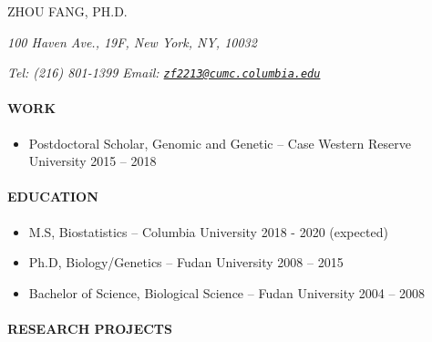 \documentclass[]{article}
\title{}
\author{}
\date{}
\let\oldparagraph\paragraph
\renewcommand{\paragraph}[1]{\oldparagraph{#1}\mbox{}}
\begin{document}
ZHOU FANG, PH.D.

\emph{100 Haven Ave., 19F, New York, NY, 10032}

\emph{Tel: (216) 801-1399 Email:
\href{mailto:zf2213@cumc.columbia.edu}{\nolinkurl{zf2213@cumc.columbia.edu}}}

\hypertarget{work}{%
\paragraph{WORK}\label{work}}

\begin{itemize}
\item
  Postdoctoral Scholar, Genomic and Genetic -- Case Western Reserve
  University { 2015 -- 2018 }
\end{itemize}

\hypertarget{education}{%
\paragraph{EDUCATION}\label{education}}

\begin{itemize}
\item
  M.S, Biostatistics -- Columbia University { 2018 - 2020 (expected) }
\item
  Ph.D, Biology/Genetics -- Fudan University { 2008 -- 2015 }
\item
  Bachelor of Science, Biological Science -- Fudan University { 2004 --
  2008 }
\end{itemize}

\hypertarget{research-projects}{%
\paragraph{RESEARCH PROJECTS}\label{research-projects}}
\end{document}

